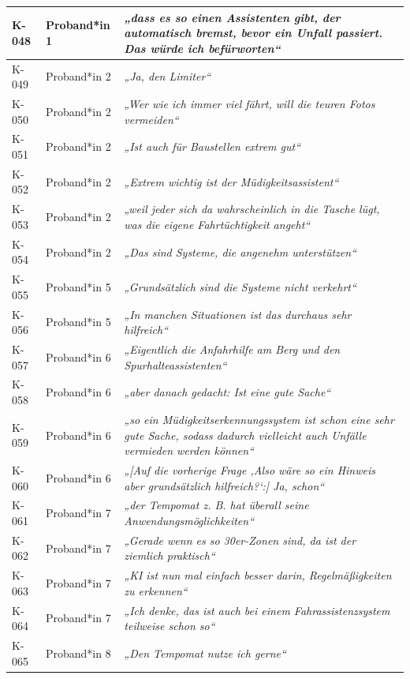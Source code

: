 {\begin{xltabular}{\textwidth}{
    |P{0.10\textwidth}
    |P{0.17\textwidth}
    |Y|
}
K-048 & Proband*in 1 & \textit{„dass es so einen Assistenten gibt, der automatisch bremst, bevor ein Unfall passiert. Das würde ich befürworten“} \\
\hline
K-049 & Proband*in 2 & \textit{„Ja, den Limiter“} \\
\hline
K-050 & Proband*in 2 & \textit{„Wer wie ich immer viel fährt, will die teuren Fotos vermeiden“} \\
\hline
K-051 & Proband*in 2 & \textit{„Ist auch für Baustellen extrem gut“} \\
\hline
K-052 & Proband*in 2 & \textit{„Extrem wichtig ist der Müdigkeitsassistent“} \\
\hline
K-053 & Proband*in 2 & \textit{„weil jeder sich da wahrscheinlich in die Tasche lügt, was die eigene Fahrtüchtigkeit angeht“} \\
\hline
K-054 & Proband*in 2 & \textit{„Das sind Systeme, die angenehm unterstützen“} \\
\hline
K-055 & Proband*in 5 & \textit{„Grundsätzlich sind die Systeme nicht verkehrt“} \\
\hline
K-056 & Proband*in 5 & \textit{„In manchen Situationen ist das durchaus sehr hilfreich“} \\
\hline
K-057 & Proband*in 6 & \textit{„Eigentlich die Anfahrhilfe am Berg und den Spurhalteassistenten“} \\
\hline
K-058 & Proband*in 6 & \textit{„aber danach gedacht: Ist eine gute Sache“} \\
\hline
K-059 & Proband*in 6 & \textit{„so ein Müdigkeitserkennungssystem ist schon eine sehr gute Sache, sodass dadurch vielleicht auch Unfälle vermieden werden können“} \\
\hline
K-060 & Proband*in 6 & \textit{„[Auf die vorherige Frage ‚Also wäre so ein Hinweis aber grundsätzlich hilfreich?‘:] Ja, schon“} \\
\hline
K-061 & Proband*in 7 & \textit{„der Tempomat z. B. hat überall seine Anwendungsmöglichkeiten“} \\
\hline
K-062 & Proband*in 7 & \textit{„Gerade wenn es so 30er-Zonen sind, da ist der ziemlich praktisch“} \\
\hline
K-063 & Proband*in 7 & \textit{„KI ist nun mal einfach besser darin, Regelmäßigkeiten zu erkennen“} \\
\hline
K-064 & Proband*in 7 & \textit{„Ich denke, das ist auch bei einem Fahrassistenzsystem teilweise schon so“} \\
\hline
K-065 & Proband*in 8 & \textit{„Den Tempomat nutze ich gerne“} \\

\end{xltabular}}
